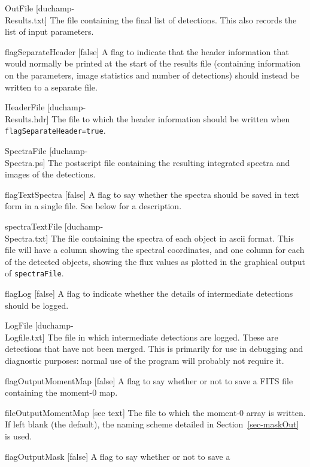 \begin{Lentry}
\item[{OutFile [duchamp-\\Results.txt]}] The file containing the
  final list of detections. This also records the list of input
  parameters.
\item[{flagSeparateHeader [false]}] A flag to indicate that the header
  information that would normally be printed at the start of the
  results file (containing information on the parameters, image
  statistics and number of detections) should instead be written to a
  separate file.
\item[{HeaderFile [duchamp-\\Results.hdr]}] The file to which the
  header information should be written when
  \texttt{flagSeparateHeader=true}.
\item[{SpectraFile [duchamp-\\Spectra.ps]}] The postscript file
  containing the resulting integrated spectra and images of the
  detections.
\item[{flagTextSpectra [false]}] A flag to say whether the spectra
  should be saved in text form in a single file. See below for a
  description. 
\item[{spectraTextFile [duchamp-\\Spectra.txt]}] The file containing
  the spectra of each object in ascii format. This file will have a
  column showing the spectral coordinates, and one column for each of
  the detected objects, showing the flux values as plotted in the
  graphical output of \texttt{spectraFile}.
\item[{flagLog [false]}] A flag to indicate whether the
  details of intermediate detections should be logged.
\item[{LogFile [duchamp-\\Logfile.txt]}] The file in which
  intermediate detections are logged. These are detections that have
  not been merged. This is primarily for use in debugging and
  diagnostic purposes: normal use of the program will probably not
  require it.
\item[{flagOutputMomentMap [false]}] A flag to say whether or not to save a
  FITS file containing the moment-0 map. 
\item[fileOutputMomentMap{ [see text]}] The file to which the moment-0 array is
  written. If left blank (the default), the naming scheme detailed in
  Section~\ref{sec-maskOut} is used.
\item[{flagOutputMask [false]}] A flag to say whether or not to save a

\end{Lentry}
